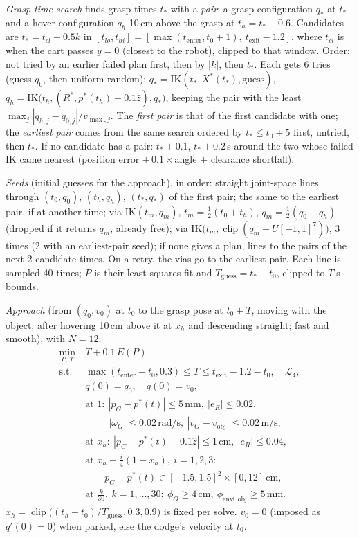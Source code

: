 \documentclass[conference]{IEEEtran}
\begin{document}
\emph{Grasp-time search} finds grasp times $t_*$ with a \emph{pair}: a grasp configuration $q_*$ at $t_*$ and a hover
configuration $q_h$ 10\,cm above the grasp at $t_h=t_*-0.6$. Candidates are $t_*=t_{cl}+0.5k$ in
$[t_{lo},t_{hi}]=[\max(t_{\text{enter}},t_0+1),\ t_{\text{exit}}-1.2]$, where $t_{cl}$ is when the cart passes
$y=0$ (closest to the robot), clipped to that window. Order: not tried by an earlier failed plan first, then by
$|k|$, then $t_*$. Each gets 6 tries (guess $q_0$, then uniform random):
$q_*=\mathrm{IK}(t_*,X^*(t_*),\text{guess})$, $q_h=\mathrm{IK}\big(t_h,(R^*,p^*(t_h)+0.1\hat z),q_*\big)$, keeping
the pair with the least $\max_j|q_{h,j}-q_{0,j}|/v_{\max,j}$. The \emph{first pair} is that of the first candidate
with one; the \emph{earliest pair} comes from the same search ordered by $t_*\le t_0+5$ first, untried, then $t_*$.
If no candidate has a pair: $t_*\pm0.1$, $t_*\pm0.2$\,s around the two whose failed IK came nearest (position error
$+\,0.1\times$angle $+$ clearance shortfall).

\emph{Seeds} (initial guesses for the approach), in order: straight joint-space lines through $(t_0,q_0)$,
$(t_h,q_h)$, $(t_*,q_*)$ of the first pair; the same to the earliest pair, if at another time; via
$\mathrm{IK}(t_m,q_m)$, $t_m=\tfrac12(t_0+t_h)$, $q_m=\tfrac12(q_0+q_h)$ (dropped if it returns $q_m$, already free);
via $\mathrm{IK}\big(t_m,\operatorname{clip}(q_m+U[-1,1]^7)\big)$, 3 times (2 with an earliest-pair seed); if none
gives a plan, lines to the pairs of the next 2 candidate times. On a retry, the vias go to the earliest pair. Each
line is sampled 40 times; $P$ is their least-squares fit and $T_{\text{guess}}=t_*-t_0$, clipped to $T$'s bounds.

\emph{Approach} (from $(q_0,v_0)$ at $t_0$ to the grasp pose at $t_0+T$, moving with the object, after hovering
10\,cm above it at $x_h$ and descending straight; fast and smooth), with $N=12$:
\begin{equation}
\begin{aligned}
\min_{P,\,T}\ & T+0.1\,E(P)\\
\text{s.t.}\ & \max(t_{\text{enter}}-t_0,0.3)\le T\le t_{\text{exit}}-1.2-t_0,\quad \mathcal L_4,\\
& q(0)=q_0,\quad \dot q(0)=v_0,\\
& \text{at } 1:\ |p_G-p^*(t)|\le5\,\text{mm},\ |e_R|\le0.02,\\
& \qquad\ \ |\omega_G|\le0.02\,\text{rad/s},\ |v_G-v_{\text{obj}}|\le0.02\,\text{m/s},\\
& \text{at } x_h:\ |p_G-p^*(t)-0.1\hat z|\le1\,\text{cm},\ |e_R|\le0.04,\\
& \text{at } x_h+\tfrac i4(1-x_h),\ i=1,2,3:\\
& \qquad p_G-p^*(t)\in[-1.5,1.5]^2\times[0,12]\,\text{cm},\\
& \text{at } \tfrac k{30},\ k=1,\dots,30:\ \phi_O\ge4\,\text{cm},\ \phi_{\text{env}\cup\text{obj}}\ge5\,\text{mm}.
\end{aligned}
\label{eq:approachC}
\end{equation}
$x_h=\operatorname{clip}\big((t_h-t_0)/T_{\text{guess}},0.3,0.9\big)$ is fixed per solve. $v_0=0$ (imposed as
$q'(0)=0$) when parked, else the dodge's velocity at $t_0$.
\end{document}
